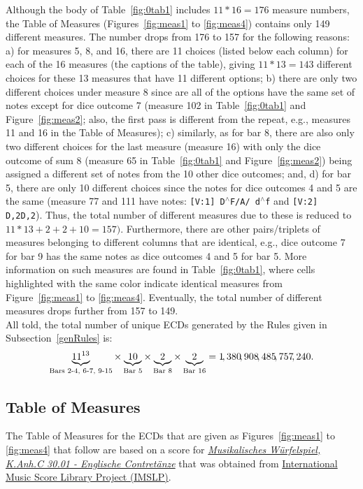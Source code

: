 \documentclass[letterpaper,x11names,svgnames,10pt]{article}
\begin{document}
Although the body of Table~\ref{fig:0tab1} includes $11*16 = 176$ measure numbers, the Table of Measures (Figures~\ref{fig:meas1} to \ref{fig:meas4}) contains only 149 different measures.  The number drops from 176 to 157 for the following reasons: a) for measures 5, 8, and 16, there are 11 choices (listed below each column) for each of the 16 measures (the captions of the table), giving $11*13=143$ different choices for these 13 measures that have 11 different options; b) there are only two different choices under measure 8 since are all of the options have the same set of notes except for dice outcome 7 (measure 102 in Table~\ref{fig:0tab1} and Figure~\ref{fig:meas2};  also, the first pass is different from the repeat, e.g., measures 11 and 16 in the Table of Measures); c) similarly, as for bar 8, there are also only two different choices for the last measure (measure 16) with only the dice outcome of sum 8 (measure 65 in Table~\ref{fig:0tab1} and Figure~\ref{fig:meas2}) being assigned a different set of notes from the 10 other dice outcomes; and, d) for bar 5, there are only 10 different choices since the notes for dice outcomes 4 and 5 are the same (measure 77 and 111 have notes: {\tt [V:1] D$^\wedge$F/A/ d$^\wedge$f} and {\tt [V:2] D,2D,2}).  Thus, the total number of different measures due to these is reduced to $11*13 + 2 + 2 + 10 = 157)$. Furthermore, there are other pairs/triplets of measures belonging to different columns that are identical, e.g., dice outcome 7 for bar 9 has the same notes as dice outcomes 4 and 5 for bar 5.  More information on such measures are found in Table~\ref{fig:0tab1}, where cells highlighted with the same color indicate identical measures from Figure~\ref{fig:meas1} to \ref{fig:meas4}. Eventually, the total number of different measures drops further from 157 to 149. \\

All told, the total number of unique ECDs generated by the Rules given in Subsection~\ref{genRules} is: $$ \underbrace{11^{13}}_{\tiny\text{Bars 2-4, 6-7, 9-15}} \times \underbrace{10}_{\tiny\text{Bar 5} } \times \underbrace{2}_{\tiny\text{Bar 8}} \times \underbrace{2}_{\tiny\text{Bar 16}} = 1\!,380\!,908\!,485\!,757\!,240.$$
 
\subsection{Table of Measures}

The Table of Measures for the ECDs that are given as Figures~\ref{fig:meas1} to \ref{fig:meas4} that follow are based on a score for \href{https://imslp.org/wiki/Musikalische_W\%C3\%BCrfelspiele\%2C_K.Anh.C.30.01_(Mozart\%2C_Wolfgang_Amadeus)}{\em Musikalisches W\"{u}rfelspiel, K.Anh.C 30.01 - Englische Contret\"{a}nze} that was obtained from \href{http://imslp.org/}{International Music Score Library Project (IMSLP)}.  
\end{document}

